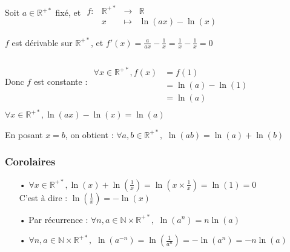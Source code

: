 \documentclass[a4paper]{article}
\begin{document}
\vspace{-3 mm}

Soit $a \in \mathbb{R}^{+*}$ fixé, et $\begin{array}{lccl}
&\\
										f : & \mathbb{R}^{+*} & \longrightarrow & \mathbb{R} \\
    										& x               & \longmapsto     & \ln(ax) - \ln(x)
										\end{array}$\\
					
\vspace{3 mm}					
										
$f$ est dérivable sur $\mathbb{R}^{+*}$, et $f'(x) = \frac{a}{ax} - \frac{1}{x} = \frac{1}{x} - \frac{1}{x} = 0$

\vspace{-5 mm}

Donc $f$ est constante : $\begin{array}{ll}
&\\
&\\
						  \forall x \in \mathbb{R}^{+*}, f(x) & = f(1)\\
    						  								  & = \ln(a) - \ln(1)\\
    						  								  & = \ln(a)\\
						  \end{array}$\\

$\forall x \in \mathbb{R}^{+*}, \ln(ax) - \ln(x) = \ln(a)$

En posant $x = b$, on obtient : $ \forall a, b \in \mathbb{R}^{+*},$ {\Large $ \ln(ab) = \ln(a) + \ln(b)$}





\subsubsection*{Corolaires}

\begin{itemize}

	\item[•] {\large $\forall x \in \mathbb{R}^{+*}, \ln(x)+\ln\left(\frac{1}{x}\right) = \ln\left(x \times \frac{1}{x}\right) = \ln(1) = 0$}\\
	C'est à dire : {\large $\ln\left(\frac{1}{x}\right) = - \ln(x)$}\\
	
	\item[•] Par récurrence : $\forall n, a \in \mathbb{N}\times\mathbb{R}^{+*},$ {\large$ \ln(a^n) = n\ln(a)$}\\
	
	\item[•] $\forall n, a \in \mathbb{N}\times\mathbb{R}^{+*},$ {\large $ \ln(a^{-n}) = \ln\left(\frac{1}{a^n}\right) = - \ln(a^n) = - n \ln(a)$}\\

\end{itemize}
\end{document}
